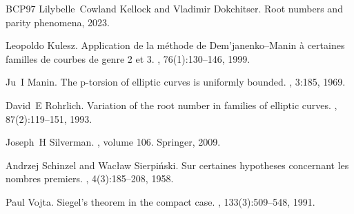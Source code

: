 \documentclass{article}
\theoremstyle{definition}
\begin{document}
\begin{thebibliography}{BCP97}
Lilybelle~Cowland Kellock and Vladimir Dokchitser.
\newblock Root numbers and parity phenomena, 2023.

Leopoldo Kulesz.
\newblock Application de la méthode de {D}em'janenko--{M}anin à certaines familles de courbes de genre 2 et 3.
, 76(1):130--146, 1999.

Ju~I Manin.
\newblock The p-torsion of elliptic curves is uniformly bounded.
, 3:185, 1969.

David~E Rohrlich.
\newblock Variation of the root number in families of elliptic curves.
, 87(2):119--151, 1993.

Joseph~H Silverman.
, volume 106.
\newblock Springer, 2009.

Andrzej Schinzel and Wac{\l}aw Sierpi{\'n}ski.
\newblock Sur certaines hypotheses concernant les nombres premiers.
, 4(3):185--208, 1958.

Paul Vojta.
\newblock Siegel's theorem in the compact case.
, 133(3):509--548, 1991.

\end{thebibliography}
\end{document}
